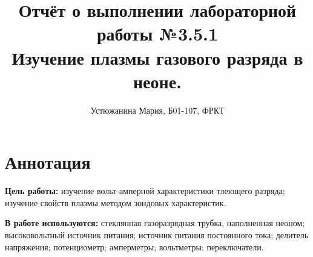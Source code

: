 \documentclass [a4paper, 12pt]{article}
\title{Отчёт о выполнении лабораторной работы №3.5.1 \\ {Изучение плазмы газового разряда в неоне.}}
\author{Устюжанина Мария, Б01-107, ФРКТ}
\begin{document}
\maketitle
\newpage

\section{Аннотация}


    
    \textbf{Цель работы:} изучение вольт-амперной характеристики тлеющего разряда; изучение свойств плазмы методом зондовых характеристик.
    
    \textbf{В работе используются:} стеклянная газоразрядная трубка, наполненная неоном; высоковольтный источник питания; источник питания постоянного тока; делитель напряжения; потенциометр; амперметры; вольтметры; переключатели.




\end{document}
